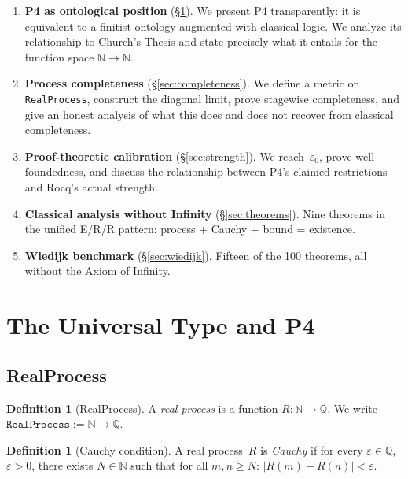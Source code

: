 \documentclass[11pt,a4paper]{article}
\theoremstyle{definition}
\newtheorem{definition}[theorem]{Definition}
\theoremstyle{remark}
\newcommand{\RP}{\texttt{RealProcess}}
\newcommand{\natQ}{\mathbb{N} \to \mathbb{Q}}
\begin{document}
\begin{enumerate}
\item \textbf{P4 as ontological position} (\S\ref{sec:type}).  We present P4 transparently: it is equivalent to a finitist ontology augmented with classical logic.  We analyze its relationship to Church's Thesis and state precisely what it entails for the function space $\mathbb{N} \to \mathbb{N}$.

\item \textbf{Process completeness} (\S\ref{sec:completeness}).  We define a metric on \RP{}, construct the diagonal limit, prove stagewise completeness, and give an honest analysis of what this does and does not recover from classical completeness.

\item \textbf{Proof-theoretic calibration} (\S\ref{sec:strength}).  We reach~$\varepsilon_0$, prove well-foundedness, and discuss the relationship between P4's claimed restrictions and Rocq's actual strength.

\item \textbf{Classical analysis without Infinity} (\S\ref{sec:theorems}).  Nine theorems in the unified E/R/R pattern: process + Cauchy + bound = existence.

\item \textbf{Wiedijk benchmark} (\S\ref{sec:wiedijk}).  Fifteen of the 100 theorems, all without the Axiom of Infinity.
\end{enumerate}


\section{The Universal Type and P4}
\label{sec:type}

\subsection{RealProcess}

\begin{definition}[RealProcess]
A \emph{real process} is a function $R : \mathbb{N} \to \mathbb{Q}$.  We write $\RP := \natQ$.
\end{definition}

\begin{definition}[Cauchy condition]
A real process~$R$ is \emph{Cauchy} if for every $\varepsilon \in \mathbb{Q}$, $\varepsilon > 0$, there exists $N \in \mathbb{N}$ such that for all $m, n \ge N$:
$|R(m) - R(n)| < \varepsilon$.
\end{definition}
\end{document}
